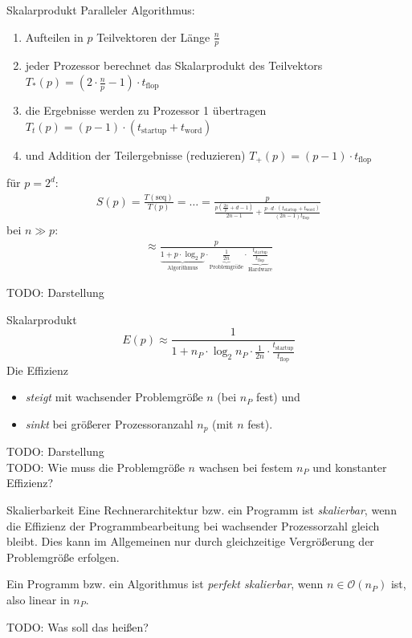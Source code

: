 \begin{example}[Speedup]{Skalarprodukt}
    Paralleler Algorithmus:
    \begin{enumerate}
        \item Aufteilen in $p$ Teilvektoren der Länge $\frac{n}{p}$
        \item jeder Prozessor berechnet das Skalarprodukt des Teilvektors $T_* (p) = \left(2 \cdot \frac{n}{p} - 1\right) \cdot t_\text{flop}$
        \item die Ergebnisse werden zu Prozessor 1 übertragen $T_t (p) = (p - 1) \cdot (t_\text{startup} + t_\text{word})$
        \item und Addition der Teilergebnisse (reduzieren) $T_+ (p) = (p - 1) \cdot t_\text{flop}$
    \end{enumerate}
    für $p=2^d$:
    \begin{align*}
        S(p) = \frac{T(\text{seq})}{T(p)} = \ldots =
        \frac{p}{\frac{p(\frac{2n}{p} + d-1)}{2n-1} + \frac{p\cdot d\cdot (t_\text{startup} + t_\text{word})}{(2n - 1)t_\text{flop}}}
    \end{align*}
    bei $n\gg p$:
    \begin{align*}
        \approx\frac{p}{
        \underbrace{1 + p\cdot \log_2 p}_{\text{Algorithmus}} \cdot
        \underbrace{\frac{1}{2n}}_{\text{Problemgröße}} \cdot
        \underbrace{\frac{t_\text{startup}}{t_\text{flop}}}_{\text{Hardware}}}
    \end{align*}

    TODO: Darstellung
\end{example}

\begin{example}[Effizienz]{Skalarprodukt}
    \[
        E(p) \approx \frac{1}{1 + n_P \cdot \log_2 n_P \cdot \frac{1}{2n} \cdot \frac{t_\text{startup}}{t_\text{flop}}}
    \]
    Die Effizienz
    \begin{itemize}
        \item \emph{steigt} mit wachsender Problemgröße $n$ (bei $n_P$ fest) und
        \item \emph{sinkt} bei größerer Prozessoranzahl $n_p$ (mit $n$ fest).
    \end{itemize}

    TODO: Darstellung\\
    TODO: Wie muss die Problemgröße $n$ wachsen bei festem $n_P$ und konstanter Effizienz?
\end{example}

\begin{defi}{Skalierbarkeit}
    Eine Rechnerarchitektur bzw. ein Programm ist \emph{skalierbar}, wenn die Effizienz der Programmbearbeitung bei wachsender Prozessorzahl gleich bleibt.
    Dies kann im Allgemeinen nur durch gleichzeitige Vergrößerung der Problemgröße erfolgen.

    Ein Programm bzw. ein Algorithmus ist \emph{perfekt skalierbar}, wenn $n \in \mathcal{O}(n_P)$ ist, also linear in $n_P$.

    TODO: Was soll das heißen?
\end{defi}

